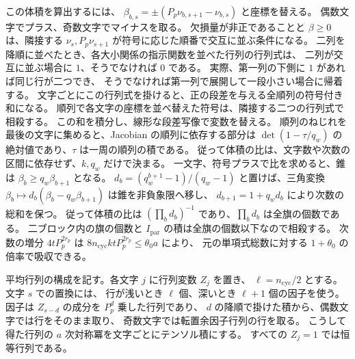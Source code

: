この体積を算出するには、
\(\beta_{b,s}=\pm(P_p\nu_{b,s+1}-\nu_{b,s})\) と座標を替える。
偶数文字でプラス、奇数文字でマイナスを取る。
欠損量が非正であることと \(\beta\ge0\) は、隣接する
\(\nu_s,P_p\nu_{s+1}\) が符号に応じた順番で交互に並ぶ条件になる。
二列を降順に並べたとき、各大小関係の指示関数を並べた行列の行列式は、
二列が交互に並ぶ場合に \(1\)、そうでなければ \(0\) である。
実際、第一列の下側に \(1\) があれば同じ行が二つでき、
そうでなければ第一列で展開して一段小さい場合に帰着する。
文字ごとにこの行列式を掛けると、正の段差を与える全順列の符号付き和になる。
順列で各文字の座標を並べ替えた符号は、隣接する二つの行列式で相殺する。
この和を積分し、線形な段差写像で変数を替える。
順列のねじれを最後の文字に集めると、Jacobian の順列に依存する部分は
\(\det(1-\tau/q_w)\) の絶対値であり、\(\tau\) は一周の順列の積である。
従って体積の比は、文字数や次数の区間に依存せず、\(k,q_w\) だけで決まる。
一文字、符号プラスで比を求めると、錐は \(\beta_b\ge q_w\beta_{b+1}\) となる。
\(d_b=(q_w^{b+1}-1)/(q_w-1)\) と置けば、三角変換
\(\beta_b\mapsto d_b(\beta_b-q_w\beta_{b+1})\) は錐を非負象限へ移し、
\(d_{b+1}=1+q_wd_b\) により次数の総和を保つ。
従って体積の比は \((\prod_b d_b)^{-1}\) であり、\(\prod_b d_b\) は全旗の個数である。
二ブロック内の旗の個数と \(I_\mathrm{par}\) の積は全旗の個数以下なので相殺する。
次数の増分 \(4tP_p^{2r_p}\) は
\(8n_\mathrm{cyc}ktP_p^{2r_p}\le\theta_0 a\) により、
元の単項式総数に対する \(1+\theta_0\) の倍率で吸収できる。

平均行列の構成を記す。各文字 \(j\) に行列変数 \(Z_j\) を置き、
\(\ell=n_\mathrm{cyc}/2\) とする。文字 \(s\) での置換には、
行が浅いとき \(\ell\) 個、深いとき \(\ell+1\) 個の因子を使う。
因子は \(Z_{s-d}\) の成分を \(P_p^d\) 乗した行列であり、
\(d\) の降順で掛けた積から、偶数文字では行をそのまま取り、
奇数文字では転置余因子行列の行を取る。
こうして得た行列の \(a\) 次対称冪を文字ごとにテンソル積にする。
すべての \(Z_j=1\) では恒等行列である。

